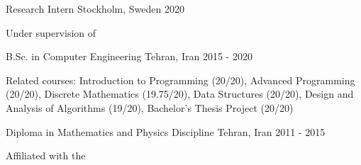 

\begin{cventries}

  \cventry
    {Research Intern} %
    {} %
    {Stockholm, Sweden} %
    {2020} %
    {
      \begin{cvitems} %
        \item {Under supervision of }
      \end{cvitems}
    }

  \cventry
    {B.Sc. in Computer Engineering} %
    {} %
    {Tehran, Iran} %
    {2015 - 2020} %
    {
      \begin{cvitems} %
        \item {Related courses: Introduction to Programming (20/20), Advanced Programming (20/20), Discrete Mathematics (19.75/20), Data Structures (20/20), Design and Analysis of Algorithms (19/20), Bachelor's Thesis Project (20/20)}
      \end{cvitems}
    }

  \cventry
    {Diploma in Mathematics and Physics Discipline} %
    {} %
    {Tehran, Iran} %
    {2011 - 2015} %
    {
      \begin{cvitems} %
        \item {Affiliated with the }
      \end{cvitems}
    }

\end{cventries}
